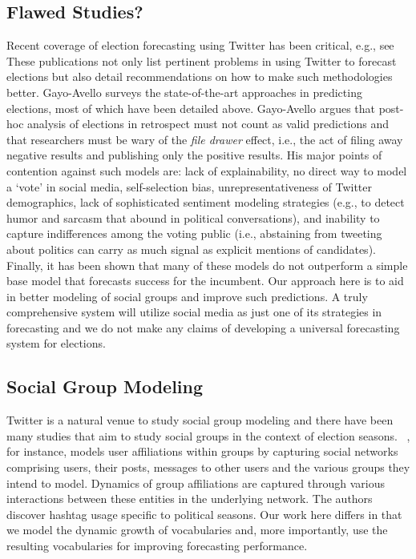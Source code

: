 \subsection{Flawed Studies?}
Recent coverage of election forecasting using Twitter has been critical, e.g.,
see~\cite{metaxas2011not,gayo2012wanted}
These publications not only list pertinent problems
in using Twitter to forecast elections but also detail recommendations on how to make such methodologies better.
Gayo-Avello surveys %
the state-of-the-art approaches in predicting elections, 
most of which have been detailed above.
Gayo-Avello argues that post-hoc analysis of elections in retrospect must not count as valid predictions and that researchers 
must be wary of the \emph{file drawer} effect, i.e., the act of filing away negative results and publishing 
only the positive results. His major points of contention against such models are:
lack of explainability, no direct way to model a `vote' in social media, self-selection bias,
unrepresentativeness of Twitter demographics, lack of sophisticated sentiment modeling strategies
(e.g., to detect humor and sarcasm that abound in political conversations), and inability to capture
indifferences among the voting public (i.e., 
abstaining from tweeting about politics can carry as much signal as explicit mentions
of candidates). Finally, it has been shown that many of these models %
do not outperform a simple
base model that forecasts success for the incumbent.
Our approach here is to aid in better modeling of social groups and improve such predictions.
A truly comprehensive system will utilize social media as just one of its strategies in forecasting and
we do not make any claims of developing a universal forecasting system for elections.

\subsection{Social Group Modeling}
Twitter is a natural venue to study social group modeling and there have been many studies that aim to
study social groups in the context of election seasons.
~\cite{huang2012social}, for instance,
models user affiliations within groups by capturing social networks comprising users, their posts,
messages to other users and the various groups they intend to model.
Dynamics of group affiliations are captured through various interactions between these entities in the underlying
network. The authors discover hashtag usage specific to political seasons.
Our work here differs in that we model the dynamic growth of vocabularies and, more importantly,
use the resulting vocabularies for improving forecasting performance.


